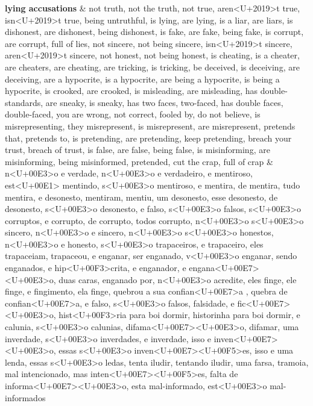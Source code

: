 \documentclass[
  12pt,
]{article}
\begin{document}
\begin{landscape}
\begin{longtabu}
\textbf{lying accusations} & not truth, not the truth, not true, aren<U+2019>t true, isn<U+2019>t true, being untruthful, is lying, are lying, is a liar, are liars, is dishonest, are  dishonest, being dishonest, is fake, are fake, being fake, is corrupt, are corrupt, full of lies, not sincere, not being sincere, isn<U+2019>t sincere, aren<U+2019>t sincere, not honest, not being honest, is cheating, is a cheater, are cheaters, are cheating, are tricking, is tricking, be deceived, is deceiving, are deceiving, are a hypocrite, is a hypocrite, are being a hypocrite, is being a hypocrite, is crooked, are crooked, is misleading, are misleading, has double-standards, are sneaky, is sneaky,  has two faces, two-faced, has double faces, double-faced, you are wrong, not correct, fooled by, do not believe, is misrepresenting, they misrepresent, is misrepresent, are misrepresent, pretends that, pretends to, is pretending, are pretending, keep pretending, breach your trust, breach of trust, is false, are false, being false, is misinforming, are misinforming, being misinformed, pretended, cut the crap, full of crap & n<U+00E3>o e verdade, n<U+00E3>o e verdadeiro, e mentiroso, est<U+00E1> mentindo, s<U+00E3>o mentiroso, e mentira, de mentira, tudo mentira, e desonesto, mentiram, mentiu, um desonesto, esse desonesto, de desonesto, s<U+00E3>o desonesto, e falso, s<U+00E3>o falsos, s<U+00E3>o corruptos, e corrupto, de corrupto, todos corrupto, n<U+00E3>o s<U+00E3>o sincero, n<U+00E3>o e sincero, n<U+00E3>o s<U+00E3>o honestos, n<U+00E3>o e honesto, s<U+00E3>o trapaceiros, e trapaceiro, eles trapaceiam, trapaceou, e enganar, ser enganado, v<U+00E3>o enganar, sendo enganados, e hip<U+00F3>crita, e enganador, e engana<U+00E7><U+00E3>o, duas caras, enganado por, n<U+00E3>o acredite, eles finge, ele finge, e fingimento, ela finge, quebrou a sua confian<U+00E7>a , quebra de confian<U+00E7>a,  e falso, s<U+00E3>o falsos, falsidade, e fic<U+00E7><U+00E3>o, hist<U+00F3>ria para boi dormir, historinha para boi dormir, e calunia, s<U+00E3>o calunias, difama<U+00E7><U+00E3>o, difamar, uma inverdade, s<U+00E3>o inverdades, e inverdade, isso e inven<U+00E7><U+00E3>o, essas s<U+00E3>o inven<U+00E7><U+00F5>es, isso e uma lenda, essas s<U+00E3>o ledas, tenta iludir, tentando iludir, uma farsa, tramoia, mal intencionado, mas inten<U+00E7><U+00F5>es, falta de informa<U+00E7><U+00E3>o, esta mal-informado, est<U+00E3>o mal-informados\\

\end{longtabu}
\end{landscape}
\end{document}
